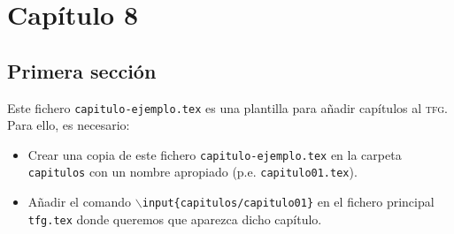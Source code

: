 
\chapter{Capítulo 8}

\section{Primera sección}

Este fichero \texttt{capitulo-ejemplo.tex} es una plantilla para añadir capítulos al \textsc{tfg}. Para ello, es necesario:
\begin{itemize}
  \item Crear una copia de este fichero \texttt{capitulo-ejemplo.tex} en la carpeta \texttt{capitulos} con un nombre apropiado (p.e. \texttt{capitulo01.tex}).
  \item Añadir el comando \texttt{$\backslash$input\{capitulos/capitulo01\}} en el fichero principal \texttt{tfg.tex} donde queremos que aparezca dicho capítulo.
\end{itemize}


\endinput
